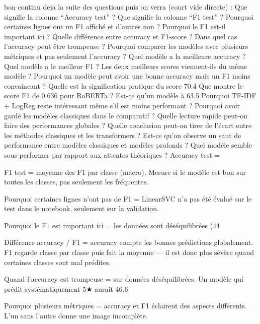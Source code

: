 bon continu deja la suite des questions puis on verra (court vide directe) : Que signifie la colonne “Accuracy test” ?
Que signifie la colonne “F1 test” ?
Pourquoi certaines lignes ont un F1 affiché et d’autres non ?
Pourquoi le F1 est-il important ici ?
Quelle différence entre accuracy et F1-score ?
Dans quel cas l’accuracy peut être trompeuse ?
Pourquoi comparer les modèles avec plusieurs métriques et pas seulement l’accuracy ?
Quel modèle a la meilleure accuracy ?
Quel modèle a le meilleur F1 ?
Les deux meilleurs scores viennent-ils du même modèle ?
Pourquoi un modèle peut avoir une bonne accuracy mais un F1 moins convaincant ?
Quelle est la signification pratique du score 70.4%
Que montre le score F1 de 0.636 pour RoBERTa ?
Est-ce qu’un modèle à 63.5%
Pourquoi TF-IDF + LogReg reste intéressant même s’il est moins performant ?
Pourquoi avoir gardé les modèles classiques dans le comparatif ?
Quelle lecture rapide peut-on faire des performances globales ?
Quelle conclusion peut-on tirer de l’écart entre les méthodes classiques et les transformers ?
Est-ce qu’on observe un saut de performance entre modèles classiques et modèles profonds ?
Quel modèle semble sous-performer par rapport aux attentes théoriques ?
Accuracy test = %

F1 test = moyenne des F1 par classe (macro). Mesure si le modèle est bon sur toutes les classes, pas seulement les fréquentes.

Pourquoi certaines lignes n'ont pas de F1 = LinearSVC n'a pas été évalué sur le test dans le notebook, seulement sur la validation.

Pourquoi le F1 est important ici = les données sont déséquilibrées (44%

Différence accuracy / F1 = accuracy compte les bonnes prédictions globalement. F1 regarde classe par classe puis fait la moyenne — il est donc plus sévère quand certaines classes sont mal prédites.

Quand l'accuracy est trompeuse = sur données déséquilibrées. Un modèle qui prédit systématiquement 5★ aurait 46.6%

Pourquoi plusieurs métriques = accuracy et F1 éclairent des aspects différents. L'un sans l'autre donne une image incomplète.


